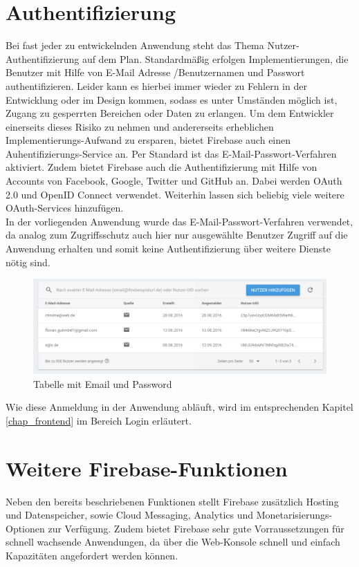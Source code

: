 \section{Authentifizierung}
\label{chap_auth}
Bei fast jeder zu entwickelnden Anwendung steht das Thema Nutzer-Authentifizierung auf dem Plan. Standardmäßig erfolgen Implementierungen, die Benutzer mit Hilfe von E-Mail Adresse /Benutzernamen und Passwort authentifizieren.
Leider kann es hierbei immer wieder zu Fehlern in der Entwicklung oder im Design kommen, sodass es unter Umständen möglich ist, Zugang zu gesperrten Bereichen oder Daten zu erlangen.
Um dem Entwickler einerseits dieses Risiko zu nehmen und andererseits erheblichen Implementierungs-Aufwand zu ersparen, bietet Firebase auch einen Auhentifizierungs-Service an.
Per Standard ist das E-Mail-Passwort-Verfahren aktiviert. Zudem bietet Firebase auch die Authentifizierung mit Hilfe von Accounts von Facebook, Google, Twitter und GitHub an. Dabei werden OAuth 2.0 und OpenID Connect verwendet. Weiterhin lassen sich
beliebig viele weitere OAuth-Services hinzufügen.\\

In der vorliegenden Anwendung wurde das E-Mail-Passwort-Verfahren verwendet, da analog zum Zugriffsschutz auch hier nur ausgewählte Benutzer Zugriff auf die Anwendung erhalten und somit keine Authentifizierung über weitere Dienste nötig sind.

\begin{figure}[H]
\centering\includegraphics[width=1\textwidth]{images/backend_authentication.png}
\caption{Tabelle mit Email und Password}
\label{backend_authentication}
\end{figure}

Wie diese Anmeldung in der Anwendung abläuft, wird im entsprechenden Kapitel \ref{chap_frontend}  im Bereich Login erläutert.

\section{Weitere Firebase-Funktionen}
Neben den bereits beschriebenen Funktionen stellt Firebase zusätzlich Hosting und Datenspeicher, sowie Cloud Messaging, Analytics und Monetarisierungs-Optionen zur Verfügung.
Zudem bietet Firebase sehr gute Vorraussetzungen für schnell wachsende Anwendungen, da über die Web-Konsole schnell und einfach Kapazitäten angefordert werden können.